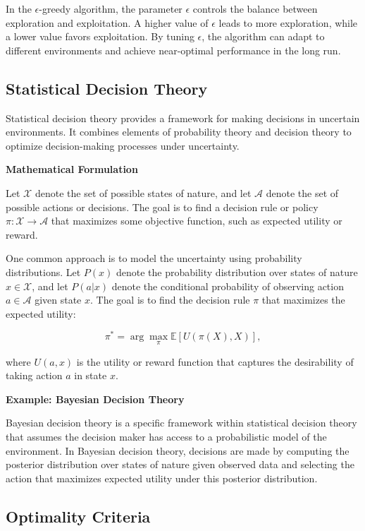 \documentclass[12pt]{book} %
\begin{document}
In the $\epsilon$-greedy algorithm, the parameter $\epsilon$ controls the balance between exploration and exploitation. A higher value of $\epsilon$ leads to more exploration, while a lower value favors exploitation. By tuning $\epsilon$, the algorithm can adapt to different environments and achieve near-optimal performance in the long run.

\subsection{Statistical Decision Theory}

Statistical decision theory provides a framework for making decisions in uncertain environments. It combines elements of probability theory and decision theory to optimize decision-making processes under uncertainty.

\textbf{Mathematical Formulation}

Let $\mathcal{X}$ denote the set of possible states of nature, and let $\mathcal{A}$ denote the set of possible actions or decisions. The goal is to find a decision rule or policy $\pi: \mathcal{X} \rightarrow \mathcal{A}$ that maximizes some objective function, such as expected utility or reward.

One common approach is to model the uncertainty using probability distributions. Let $P(x)$ denote the probability distribution over states of nature $x \in \mathcal{X}$, and let $P(a|x)$ denote the conditional probability of observing action $a \in \mathcal{A}$ given state $x$. The goal is to find the decision rule $\pi$ that maximizes the expected utility:

\begin{equation*}
    \pi^* = \arg\max_{\pi} \mathbb{E}[U(\pi(X), X)],
\end{equation*}

where $U(a, x)$ is the utility or reward function that captures the desirability of taking action $a$ in state $x$.

\textbf{Example: Bayesian Decision Theory}

Bayesian decision theory is a specific framework within statistical decision theory that assumes the decision maker has access to a probabilistic model of the environment. In Bayesian decision theory, decisions are made by computing the posterior distribution over states of nature given observed data and selecting the action that maximizes expected utility under this posterior distribution.

\subsection{Optimality Criteria}
\end{document}
